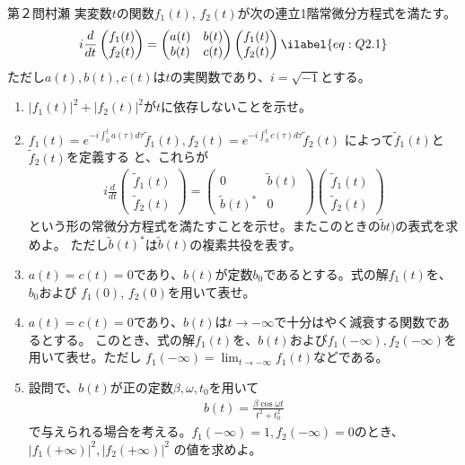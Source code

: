 \begin{question}{第２問}{村瀬}
実変数$t$の関数$f_1(t),\,f_2(t)$が次の連立1階常微分方程式を満たす。
  \begin{align}
    i\frac{d}{dt}\begin{pmatrix} f_1(t) \\ f_2(t) \end{pmatrix}
    = \begin{pmatrix} a(t) & b(t) \\ b(t) & c(t) \end{pmatrix}
      \begin{pmatrix} f_1(t) \\ f_2(t) \end{pmatrix} \ilabel{eq:Q2.1}
  \end{align}
  ただし$a(t), b(t), c(t)$は$t$の実関数であり、$i=\sqrt{-1}$とする。

\begin{enumerate}
\item
  $|f_1(t)|^2+|f_2(t)|^2$が$t$に依存しないことを示せ。
\item
  $f_1(t) = e^{-i\int_0^t a(\tau) d\tau} \tilde{f}_1(t), f_2(t) = e^{-i\int_0^t c(\tau)d\tau} \tilde{f}_2(t)$
  によって$\tilde{f}_1(t)$と$\tilde{f}_2(t)$を定義する
  と、これらが
  \begin{align*}
    i\frac{d}{dt}\begin{pmatrix} \tilde{f}_1(t) \\ \tilde{f}_2(t) \end{pmatrix}
    = \begin{pmatrix} 0 & \tilde{b}(t) \\ \tilde{b}(t)^* & 0 \end{pmatrix}
      \begin{pmatrix} \tilde{f}_1(t) \\ \tilde{f}_2(t) \end{pmatrix}
  \end{align*}
  という形の常微分方程式を満たすことを示せ。またこのときの$\tilde{b}t)$の表式を求めよ。
  ただし$\tilde{b}(t)^*$は$\tilde{b}(t)$の複素共役を表す。

\item
  $a(t)=c(t)=0$であり、$b(t)$が定数$b_0$であるとする。式の解$f_1(t)$を、$b_0$および
  $f_1(0)$, $f_2(0)$を用いて表せ。

\item{}
  $a(t)=c(t)=0$であり、$b(t)$は$t\to-\infty$で十分はやく減衰する関数であるとする。
  このとき、式の解$f_1(t)$を、$b(t)$および$f_1(-\infty), f_2(-\infty)$を用いて表せ。ただし
  $f_1(-\infty)=\displaystyle\lim_{t\to-\infty} f_1(t)$などである。

\item
  設問で、$b(t)$が正の定数$\beta, \omega, t_0$を用いて
  \begin{align*}
    b(t) = \frac{\beta\cos\omega t}{t^2+t_0^2}
  \end{align*}
  で与えられる場合を考える。$f_1(-\infty)=1, f_2(-\infty) = 0$のとき、$|f_1(+\infty)|^2, |f_2(+\infty)|^2$
  の値を求めよ。
\end{enumerate}
\end{question}
